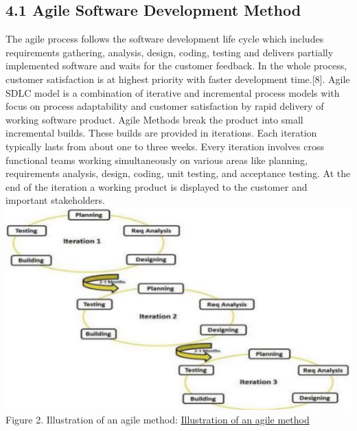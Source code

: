 \documentclass[12pt]{extreport}
\begin{document}
\subsection*{4.1	Agile Software Development Method}
The agile process follows the software development life cycle which includes requirements gathering, analysis, design, coding, testing and delivers partially implemented software and waits for the customer feedback. In the whole process, customer satisfaction is at highest priority with faster development time.[8]. 
Agile SDLC model is a combination of iterative and incremental process models with focus on process adaptability and customer satisfaction by rapid delivery of working software product. Agile Methods break the product into small incremental builds. These builds are provided in iterations. Each iteration typically lasts from about one to three weeks. Every iteration involves cross functional teams working simultaneously on various areas like planning, requirements analysis, design, coding, unit testing, and acceptance testing. At the end of the iteration a working product is displayed to the customer and important stakeholders.
\includegraphics*{image2}
\label{image2} Figure 2. Illustration of an agile method: 
 \href{https://www.tutorialspoint.com/sdlc/pdf/sdlc_agile_model.pdf}{Illustration of an agile method}
 
\end{document}
